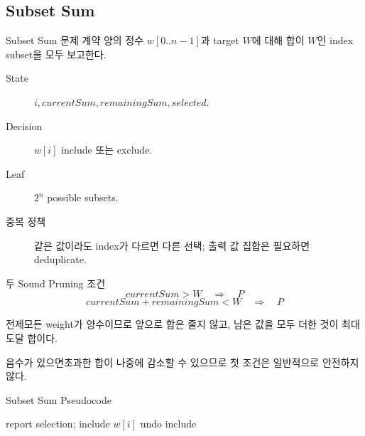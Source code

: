 \subsection{Subset Sum}
\begin{frame}{Subset Sum 문제 계약}
양의 정수 \(w[0..n-1]\)과 target \(W\)에 대해 합이 \(W\)인 index subset을 모두 보고한다.
\begin{description}
\item[State] \(i,currentSum,remainingSum,selected\).
\item[Decision] \(w[i]\) include 또는 exclude.
\item[Leaf] \(2^n\) possible subsets.
\item[중복 정책] 같은 값이라도 index가 다르면 다른 선택; 출력 값 집합은 필요하면 deduplicate.
\end{description}
\end{frame}
\begin{frame}{두 Sound Pruning 조건}
\[
currentSum>W
\quad\Longrightarrow\quad P
\]
\[
currentSum+remainingSum<W
\quad\Longrightarrow\quad P
\]
\begin{block}{전제}모든 weight가 양수이므로 앞으로 합은 줄지 않고, 남은 값을 모두 더한 것이 최대 도달 합이다.\end{block}
\begin{alertblock}{음수가 있으면}초과한 합이 나중에 감소할 수 있으므로 첫 조건은 일반적으로 안전하지 않다.\end{alertblock}
\end{frame}
\begin{frame}{Subset Sum Pseudocode}
\algofont\begin{algorithmic}[1]
\State report selection; \Return\EndIf
{}\State\Return\EndIf
\State include \(w[i]\)
\State {}
\State undo include
\State {}
\EndProcedure
\end{algorithmic}
\end{frame}
